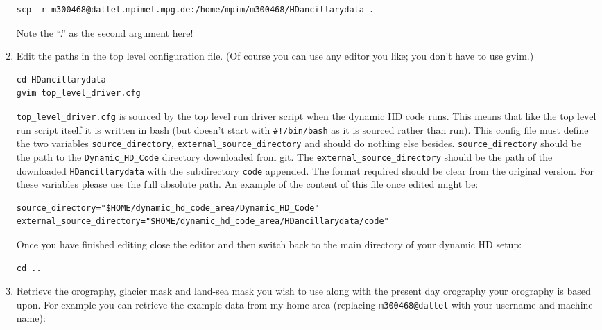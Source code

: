\documentclass{article}
\begin{document}
\begin{enumerate}
\begin{lstlisting}[style=bash_input,breaklines=true]
scp -r m300468@dattel.mpimet.mpg.de:/home/mpim/m300468/HDancillarydata .
\end{lstlisting}
Note the ``.'' as the second argument here!
\item Edit the paths in the top level configuration file. (Of course you can use any editor you like; you don't have to use gvim.)
\begin{lstlisting}[style=bash_input]
cd HDancillarydata
gvim top_level_driver.cfg
\end{lstlisting}
\lstinline[style=bash_input]{top_level_driver.cfg} is sourced by the top level run driver script when the dynamic HD code runs. This means that like the top level run script itself it is written in bash (but doesn't start with \lstinline[style=bash_input]{#!/bin/bash} as it is sourced rather than run). This config file must define the two variables \lstinline[style=bash_input]{source_directory}, \lstinline[style=bash_input]{external_source_directory} and should do nothing else besides. \lstinline[style=bash_input]{source_directory} should be the path to the \lstinline[style=bash_input]{Dynamic_HD_Code} directory downloaded from git. The \lstinline[style=bash_input]{external_source_directory} should be the path of the downloaded \lstinline[style=bash_input]{HDancillarydata} with the subdirectory \lstinline[style=bash_input]{code} appended. The format required should be clear from the original version. For these variables please use the full absolute path. An example of the content of this file once edited might be:
\begin{lstlisting}[style=bash_input,breaklines=true]
source_directory="$HOME/dynamic_hd_code_area/Dynamic_HD_Code"
external_source_directory="$HOME/dynamic_hd_code_area/HDancillarydata/code"
\end{lstlisting}
Once you have finished editing close the editor and then switch back to the main directory of your dynamic HD setup:
\begin{lstlisting}[style=bash_input]
cd ..
\end{lstlisting}
\item Retrieve the orography, glacier mask and land-sea mask you wish to use along with the present day orography your orography is based upon. For example you can retrieve the example data from my home area (replacing \lstinline[style=bash_input]{m300468@dattel} with your username and machine name):
\begin{lstlisting}[style=bash_input,breaklines=true]

\end{lstlisting}
\end{enumerate}
\end{document}
